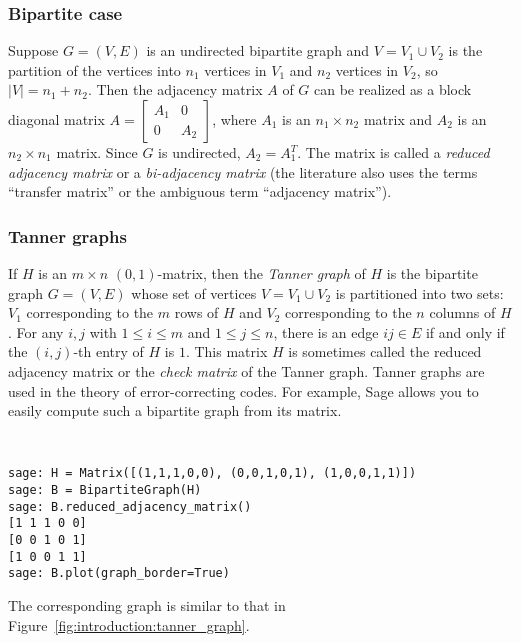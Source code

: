
\subsubsection{Bipartite case}

Suppose $G = (V, E)$ is an undirected bipartite graph and
$V = V_1 \cup V_2$ is the partition of the vertices into $n_1$
vertices in $V_1$ and $n_2$ vertices in $V_2$, so $|V| = n_1 + n_2$.
Then the adjacency matrix $A$ of $G$ can be realized as a block
diagonal matrix
$A
=
\begin{bmatrix}
A_1 & 0 \\
0 & A_2
\end{bmatrix}$,
where $A_1$ is an $n_1 \times n_2$ matrix and $A_2$ is an
$n_2 \times n_1$ matrix. Since $G$ is undirected, $A_2 = A_1^T$.
The matrix is called a \emph{reduced adjacency matrix} or a
\emph{bi-adjacency matrix} (the literature also uses
the terms ``transfer matrix'' or the ambiguous term
``adjacency matrix'').



\subsubsection{Tanner graphs}

If $H$ is an $m \times n$ $(0,1)$-matrix, then the \emph{Tanner graph}
of $H$ is the bipartite graph $G = (V,E)$ whose set of vertices
$V = V_1 \cup V_2$ is partitioned into two sets: $V_1$ corresponding
to the $m$ rows of $H$ and $V_2$ corresponding to the $n$ columns of $H$.
For any $i,j$ with $1 \leq i \leq m$ and $1 \leq j \leq n$, there is
an edge $ij \in E$ if and only if the $(i,j)$-th entry of $H$ is
$1$. This matrix $H$ is sometimes called the
reduced adjacency matrix or the
\emph{check matrix} of the Tanner graph.
Tanner graphs are used in the theory of error-correcting codes.
For example, Sage allows you to easily compute such a bipartite graph
from its matrix.
%
\begin{center}
\fontsize{9pt}{9pt}
\selectfont
\tt
\begin{lstlisting}
sage: H = Matrix([(1,1,1,0,0), (0,0,1,0,1), (1,0,0,1,1)])
sage: B = BipartiteGraph(H)
sage: B.reduced_adjacency_matrix()
[1 1 1 0 0]
[0 0 1 0 1]
[1 0 0 1 1]
sage: B.plot(graph_border=True)
\end{lstlisting}
\end{center}
%
The corresponding graph is similar to that in
Figure~\ref{fig:introduction:tanner_graph}.

